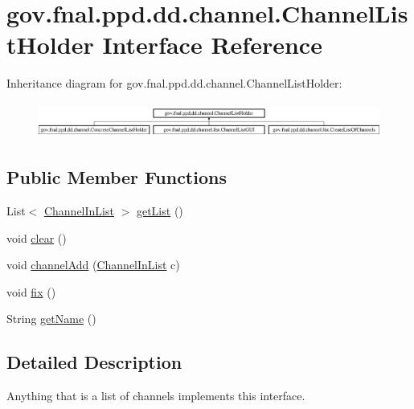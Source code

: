 \hypertarget{interfacegov_1_1fnal_1_1ppd_1_1dd_1_1channel_1_1ChannelListHolder}{\section{gov.\-fnal.\-ppd.\-dd.\-channel.\-Channel\-List\-Holder Interface Reference}
\label{interfacegov_1_1fnal_1_1ppd_1_1dd_1_1channel_1_1ChannelListHolder}
}
Inheritance diagram for gov.\-fnal.\-ppd.\-dd.\-channel.\-Channel\-List\-Holder\-:\begin{figure}[H]
\begin{center}
\leavevmode
\includegraphics[height=1.174004cm]{interfacegov_1_1fnal_1_1ppd_1_1dd_1_1channel_1_1ChannelListHolder}
\end{center}
\end{figure}
\subsection*{Public Member Functions}
\begin{DoxyCompactItemize}
\item 
List$<$ \hyperlink{interfacegov_1_1fnal_1_1ppd_1_1dd_1_1channel_1_1ChannelInList}{Channel\-In\-List} $>$ \hyperlink{interfacegov_1_1fnal_1_1ppd_1_1dd_1_1channel_1_1ChannelListHolder_a964a6a5e52085e0c24f855f71428d5c3}{get\-List} ()
\item 
void \hyperlink{interfacegov_1_1fnal_1_1ppd_1_1dd_1_1channel_1_1ChannelListHolder_ac8fd01c353de039cc05d830b971e87b1}{clear} ()
\item 
void \hyperlink{interfacegov_1_1fnal_1_1ppd_1_1dd_1_1channel_1_1ChannelListHolder_a8541dd9579b0387798a620920cefb18e}{channel\-Add} (\hyperlink{interfacegov_1_1fnal_1_1ppd_1_1dd_1_1channel_1_1ChannelInList}{Channel\-In\-List} c)
\item 
void \hyperlink{interfacegov_1_1fnal_1_1ppd_1_1dd_1_1channel_1_1ChannelListHolder_a6d75a17b8c7a601e8f23dce56386fbc3}{fix} ()
\item 
String \hyperlink{interfacegov_1_1fnal_1_1ppd_1_1dd_1_1channel_1_1ChannelListHolder_a9e2d59130d1583a9eaa93840ba1c4004}{get\-Name} ()
\end{DoxyCompactItemize}


\subsection{Detailed Description}
Anything that is a list of channels implements this interface.

